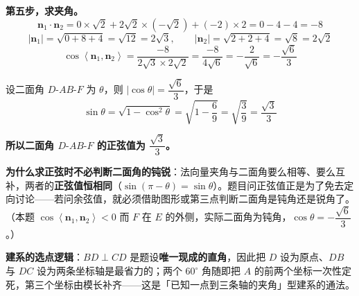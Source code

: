 \begin{answer}
\textbf{第五步，求夹角。}
\nopagebreak[4]
\[\boldsymbol n_1\cdot\boldsymbol n_2=0\times\sqrt2+2\sqrt2\times\left(-\sqrt2\right)+(-2)\times2=0-4-4=-8\]
\nopagebreak[4]
\[\left|\boldsymbol n_1\right|=\sqrt{0+8+4}=\sqrt{12}=2\sqrt3,\qquad \left|\boldsymbol n_2\right|=\sqrt{2+2+4}=\sqrt8=2\sqrt2\]
\nopagebreak[4]
\[\cos\left\langle\boldsymbol n_1,\boldsymbol n_2\right\rangle=\frac{-8}{2\sqrt3\times2\sqrt2}=\frac{-8}{4\sqrt6}=-\frac2{\sqrt6}=-\frac{\sqrt6}3\]

设二面角 $D\text{-}AB\text{-}F$ 为 $\theta$，则 $|\cos\theta|=\dfrac{\sqrt6}3$，于是
\nopagebreak[4]
\[\sin\theta=\sqrt{1-\cos^{2}\theta}=\sqrt{1-\frac69}=\sqrt{\frac39}=\frac{\sqrt3}3\]

\textbf{所以二面角 $D\text{-}AB\text{-}F$ 的正弦值为 $\dfrac{\sqrt3}3$。}

\begin{gktip}
\textbf{为什么求正弦时不必判断二面角的钝锐}：法向量夹角与二面角要么相等、要么互补，两者的\textbf{正弦值恒相同}（$\sin(\pi-\theta)=\sin\theta$）。题目问正弦值正是为了免去定向讨论——若问余弦值，就必须借助图形或第三点判断二面角是钝角还是锐角了。（本题 $\cos\left\langle\boldsymbol n_1,\boldsymbol n_2\right\rangle<0$ 而 $F$ 在 $E$ 的外侧，实际二面角为钝角，$\cos\theta=-\dfrac{\sqrt6}3$。）

\textbf{建系的选点逻辑}：$BD\perp CD$ 是题设\textbf{唯一现成的直角}，因此把 $D$ 设为原点、$DB$ 与 $DC$ 设为两条坐标轴是最省力的；两个 $60^\circ$ 角随即把 $A$ 的前两个坐标一次性定死，第三个坐标由模长补齐——这是「已知一点到三条轴的夹角」型建系的通法。
\end{gktip}



\par\medskip

\end{answer}

